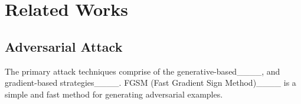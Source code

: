 \section{Related Works}
\subsection{Adversarial Attack}

The primary attack techniques comprise of the generative-based____, and gradient-based strategies____. FGSM (Fast Gradient Sign Method)____ is a simple and fast method for generating adversarial examples.





